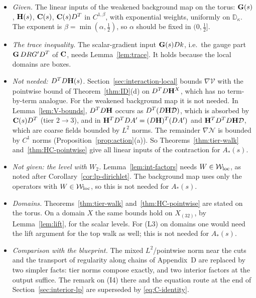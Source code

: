 \begin{itemize}
\item \emph{Given.} The linear inputs of the weakened background map on the torus: $\mathbf G(s)$, $\mathbf H(s)$, $\mathbf C(s)$, $\mathbf C(s)D^T$ in $C^{1,\beta}$, with exponential weights, uniformly on $\mathbb D_\kappa$. The exponent is $\beta=\min(\alpha,\frac12)$, so $\alpha$ should be fixed in $(0,\frac12]$.
\item \emph{The trace inequality.} The scalar-gradient input $\mathbf G(s)Dk$, i.e.\ the gauge part $\mathbf G\,DRG'D^T$ of $\mathbf C$, needs Lemma~\ref{lem:trace}. It holds because the local domains are boxes.
\item \emph{Not needed: $D^TD\mathbf H(s)$.} Section~\ref{sec:interaction-local} bounds $\nabla\mathcal V$ with the pointwise bound of Theorem~\ref{thm:ID}(d) on $D^TD\mathbf H^X$, which has no term-by-term analogue. For the weakened background map it is not needed. In Lemma~\ref{lem:V-bounds}, $D^TD\mathbf H$ occurs as $D^T(D\mathbf H\mathcal D)$, which is absorbed by $\mathbf C(s)D^T$ (tier $2\to3$), and in $\mathbf H^TD^TDA'=(D\mathbf H)^T(DA')$ and $\mathbf H^TD^TD\mathbf H\mathcal D$, which are coarse fields bounded by $L^2$ norms. The remainder $\nabla\mathcal N$ is bounded by $C^1$ norms (Proposition~\ref{prop:action}(a)). So Theorems~\ref{thm:tier-walk} and~\ref{thm:HC-pointwise} give all linear inputs of the contraction for $A_*(s)$.
\item \emph{Not given: the level with $W_2$.} Lemma~\ref{lem:int-factors} needs $W\in\mathcal W_{\rm loc}$, as noted after Corollary~\ref{cor:lp-dirichlet}. The background map uses only the operators with $W\in\mathcal W_{\rm loc}$, so this is not needed for $A_*(s)$.
\item \emph{Domains.} Theorems~\ref{thm:tier-walk} and~\ref{thm:HC-pointwise} are stated on the torus. On a domain $X$ the same bounds hold on $X_{(32)}$, by Lemma~\ref{lem:lift}, for the scalar levels. For (L3) on domains one would need the lift argument for the top walk as well; this is not needed for $A_*(s)$.
\item \emph{Comparison with the blueprint.} The mixed $L^2$/pointwise norm near the cuts and the transport of regularity along chains of Appendix~D are replaced by two simpler facts: tier norms compose exactly, and two interior factors at the output suffice. The remark on (I4) there and the equation route at the end of Section~\ref{sec:interior-lp} are superseded by \eqref{eq:C-identity}.
\end{itemize}
